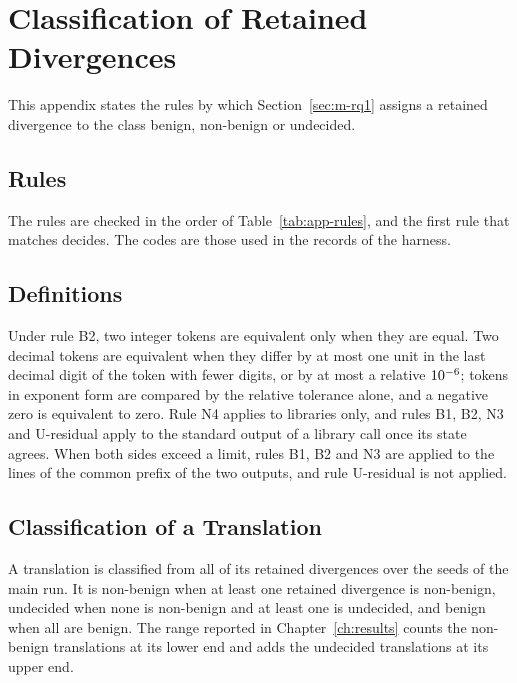 \chapter{Classification of Retained Divergences}\label{app:classes}

This appendix states the rules by which Section~\ref{sec:m-rq1} assigns a retained divergence to the class benign, non-benign or undecided.

\section{Rules}\label{app:c-rules}

The rules are checked in the order of Table~\ref{tab:app-rules}, and the first rule that matches decides. The codes are those used in the records of the harness.


\section{Definitions}\label{app:c-definitions}

Under rule B2, two integer tokens are equivalent only when they are equal. Two decimal tokens are equivalent when they differ by at most one unit in the last decimal digit of the token with fewer digits, or by at most a relative $10^{-6}$; tokens in exponent form are compared by the relative tolerance alone, and a negative zero is equivalent to zero. Rule N4 applies to libraries only, and rules B1, B2, N3 and U-residual apply to the standard output of a library call once its state agrees. When both sides exceed a limit, rules B1, B2 and N3 are applied to the lines of the common prefix of the two outputs, and rule U-residual is not applied.

\section{Classification of a Translation}\label{app:c-aggregation}

A translation is classified from all of its retained divergences over the seeds of the main run. It is non-benign when at least one retained divergence is non-benign, undecided when none is non-benign and at least one is undecided, and benign when all are benign. The range reported in Chapter~\ref{ch:results} counts the non-benign translations at its lower end and adds the undecided translations at its upper end.

